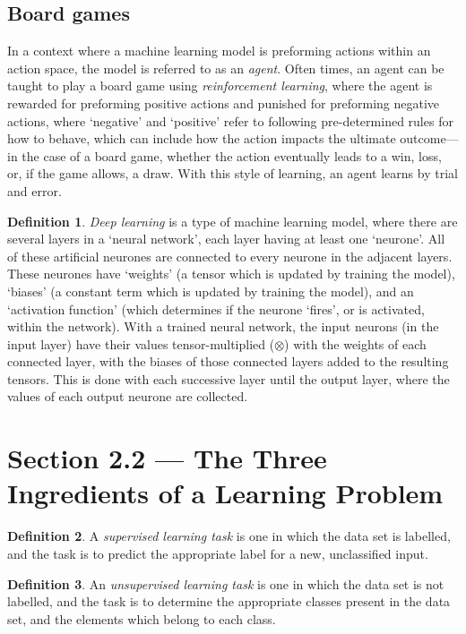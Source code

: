 \documentclass{article}
\theoremstyle{definition}
\newtheorem{definition}{Definition}[section]
\begin{document}
\subsection{Board games}
In a context where a machine learning model is preforming actions within an action space, the model is referred to as an \emph{agent}. Often times, an agent can be taught to play a board game using \emph{reinforcement learning}, where the agent is rewarded for preforming positive actions and punished for preforming negative actions, where `negative' and `positive' refer to following pre-determined rules for how to behave, which can include how the action impacts the ultimate outcome---in the case of a board game, whether the action eventually leads to a win, loss, or, if the game allows, a draw. With this style of learning, an agent learns by trial and error.
\begin{definition}
    \emph{Deep learning} is a type of machine learning model, where there are several layers in a `neural network', each layer having at least one `neurone'. All of these artificial neurones are connected to every neurone in the adjacent layers. These neurones have `weights' (a tensor which is updated by training the model), `biases' (a constant term which is updated by training the model), and an `activation function' (which determines if the neurone `fires', or is activated, within the network). With a trained neural network, the input neurons (in the input layer) have their values tensor-multiplied ($\otimes$) with the weights of each connected layer, with the biases of those connected layers added to the resulting tensors. This is done with each successive layer until the output layer, where the values of each output neurone are collected.
\end{definition}

\section{Section 2.2 --- The Three Ingredients of a Learning Problem}
\begin{definition}
    A \emph{supervised learning task} is one in which the data set is labelled, and the task is to predict the appropriate label for a new, unclassified input.
\end{definition}
\begin{definition}
    An \emph{unsupervised learning task} is one in which the data set is not labelled, and the task is to determine the appropriate classes present in the data set, and the elements which belong to each class.
\end{definition}
\end{document}
